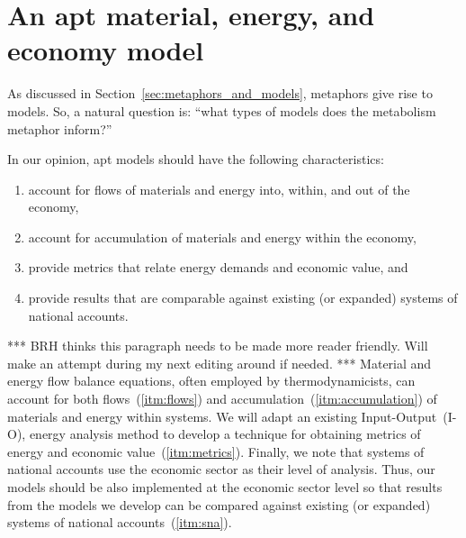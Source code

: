 \section{An apt material, energy, and economy model}
\label{sec:apt_models}

As discussed in Section~\ref{sec:metaphors_and_models}, 
metaphors give rise to models.
So, a natural question is: 
``what types of models does the metabolism metaphor inform?''

In our opinion, apt models should have the following characteristics:

\begin{enumerate}
	\item{\label{itm:flows}account for flows of materials and energy 
			into, within, and out of the economy,}
	\item{\label{itm:accumulation}account for accumulation of materials and energy 
			within the economy,}
	\item{\label{itm:metrics}provide metrics that relate energy demands and economic value, and}
	\item{\label{itm:sna}provide results that are comparable against existing 
			(or expanded) systems of national accounts.}
\end{enumerate}

*** BRH thinks this paragraph needs to be made more reader friendly. Will make an attempt during my next 
editing around if needed. *** 
Material and energy flow balance equations, 
often employed by thermodynamicists, 
can account for both flows~(\ref{itm:flows}) and accumulation~(\ref{itm:accumulation}) 
of materials and energy within systems.
We will adapt an existing Input-Output~(I-O),
energy analysis method to develop a 
technique for obtaining metrics of energy and economic value~(\ref{itm:metrics}).
Finally, we note that systems of national accounts use the economic sector
as their level of analysis. 
Thus, our models should be also implemented at the economic sector level
so that results from the models we develop can be 
compared against existing (or expanded) systems of national accounts~(\ref{itm:sna}).


